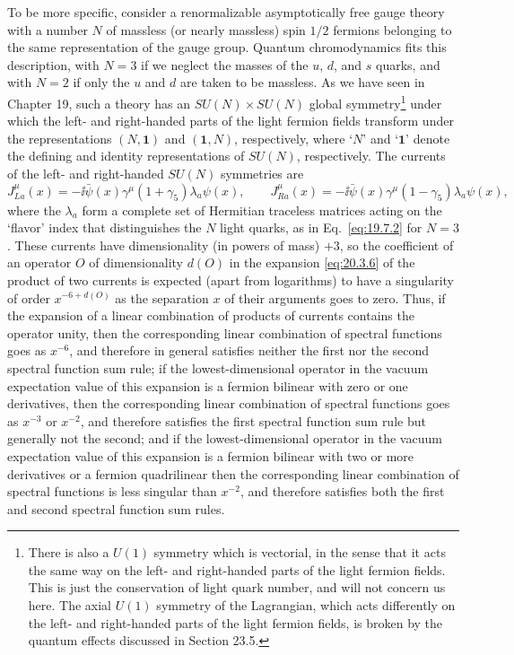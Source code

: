 To be more specific, consider a renormalizable asymptotically free gauge theory with a number $N$ of massless (or nearly massless) spin $1/2$ fermions belonging to the same representation of the gauge group. Quantum chromodynamics fits this description, with $N=3$ if we neglect the masses of the $u$, $d$, and $s$ quarks, and with $N=2$ if only the $u$ and $d$ are taken to be massless. As we have seen in Chapter 19, such a theory has an $SU(N)\times SU(N)$ global symmetry\footnote{There is also a $U(1)$ symmetry which is vectorial, in the sense that it acts the same way on the left- and right-handed parts of the light fermion fields. This is just the conservation of light quark number, and will not concern us here. The axial $U(1)$ symmetry of the Lagrangian, which acts differently on the left- and right-handed parts of the light fermion fields, is broken by the quantum effects discussed in Section 23.5.} under which the left- and right-handed parts of the light fermion fields transform under the representations $(N,\mathbf{1})$ and $(\mathbf{1},N)$, respectively, where `$N$' and `$\mathbf{1}$' denote the defining and identity representations of $SU(N)$, respectively. The currents of the left- and right-handed $SU(N)$ symmetries are
\begin{equation}
J_{La}^\mu(x)
=-\ii\bar\psi(x)\gamma^\mu(1+\gamma_5)\lambda_a\psi(x),
\qquad
J_{Ra}^\mu(x)
=-\ii\bar\psi(x)\gamma^\mu(1-\gamma_5)\lambda_a\psi(x),
\tag{20.5.11}\label{eq:20.5.11}
\end{equation}
where the $\lambda_a$ form a complete set of Hermitian traceless matrices acting on the `flavor' index that distinguishes the $N$ light quarks, as in Eq.~\eqref{eq:19.7.2} for $N=3$. These currents have dimensionality (in powers of mass) $+3$, so the coefficient of an operator $O$ of dimensionality $d(O)$ in the expansion \eqref{eq:20.3.6} of the product of two currents is expected (apart from logarithms) to have a singularity of order $x^{-6+d(O)}$ as the separation $x$ of their arguments goes to zero. Thus, if the expansion of a linear combination of products of currents contains the operator unity, then the corresponding linear combination of spectral functions goes as $x^{-6}$, and therefore in general satisfies neither the first nor the second spectral function sum rule; if the lowest-dimensional operator in the vacuum expectation value of this expansion is a fermion bilinear with zero or one derivatives, then the corresponding linear combination of spectral functions goes as $x^{-3}$ or $x^{-2}$, and therefore satisfies the first spectral function sum rule but generally not the second; and if the lowest-dimensional operator in the vacuum expectation value of this expansion is a fermion bilinear with two or more derivatives or a fermion quadrilinear then the corresponding linear combination of spectral functions is less singular than $x^{-2}$, and therefore satisfies both the first and second spectral function sum rules.

